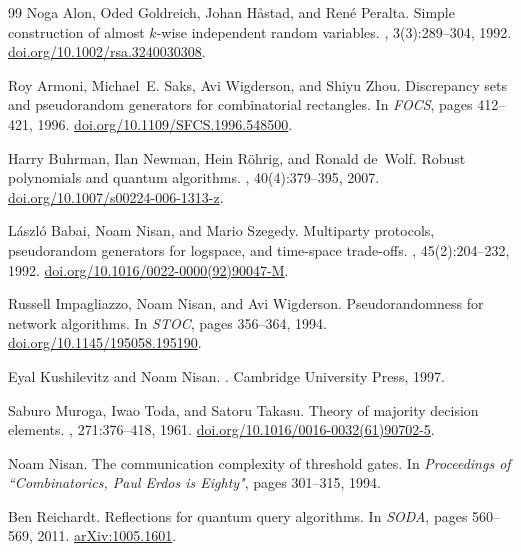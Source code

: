 \documentclass[10pt,a4paper]{article}
\begin{document}
\begin{thebibliography}{99}
Noga Alon, Oded Goldreich, Johan H{\aa}stad, and Ren{\'{e}} Peralta.
\newblock Simple construction of almost $k$-wise independent random variables.
, 3(3):289--304, 1992.
\newblock
  \href{https://doi.org/10.1002/rsa.3240030308}{doi.org/10.1002/rsa.3240030308}.

Roy Armoni, Michael~E. Saks, Avi Wigderson, and Shiyu Zhou.
\newblock Discrepancy sets and pseudorandom generators for combinatorial
  rectangles.
\newblock In {\em {FOCS}}, pages 412--421, 1996.
\newblock
  \href{https://doi.org/10.4230/10.1109/SFCS.1996.548500}{doi.org/10.1109/SFCS.1996.548500}.

Harry Buhrman, Ilan Newman, Hein R{\"{o}}hrig, and Ronald de~Wolf.
\newblock Robust polynomials and quantum algorithms.
, 40(4):379--395, 2007.
\newblock
  \href{https://doi.org/10.1007/s00224-006-1313-z}{doi.org/10.1007/s00224-006-1313-z}.

L{\'{a}}szl{\'{o}} Babai, Noam Nisan, and Mario Szegedy.
\newblock Multiparty protocols, pseudorandom generators for logspace, and
  time-space trade-offs.
, 45(2):204--232, 1992.
\newblock
  \href{https://doi.org/10.1016/0022-0000(92)90047-M}{doi.org/10.1016/0022-0000(92)90047-M}.

Russell Impagliazzo, Noam Nisan, and Avi Wigderson.
\newblock Pseudorandomness for network algorithms.
\newblock In {\em {STOC}}, pages 356--364, 1994.
\newblock
  \href{https://doi.org/10.1145/195058.195190}{doi.org/10.1145/195058.195190}.

Eyal Kushilevitz and Noam Nisan.
.
\newblock Cambridge University Press, 1997.

Saburo Muroga, Iwao Toda, and Satoru Takasu.
\newblock Theory of majority decision elements.
, 271:376--418, 1961.
\newblock
  \href{https://doi.org/10.1016/0016-0032(61)90702-5}{doi.org/10.1016/0016-0032(61)90702-5}.

Noam Nisan.
\newblock The communication complexity of threshold gates.
\newblock In {\em Proceedings of ``Combinatorics, Paul Erdos is Eighty"}, pages
  301--315, 1994.

Ben Reichardt.
\newblock Reflections for quantum query algorithms.
\newblock In {\em {SODA}}, pages 560--569, 2011.
\newblock \href{https://arxiv.org/abs/1005.1601}{arXiv:1005.1601}.


\end{thebibliography}
\end{document}
